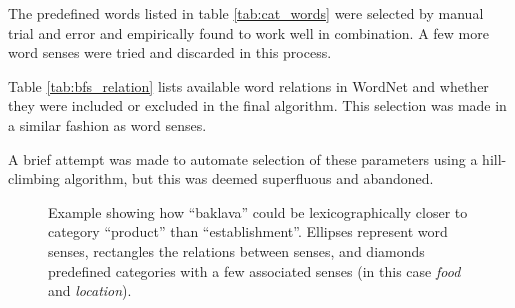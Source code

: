 \documentclass[a4paper,11pt]{kth-mag}
\begin{document}
The predefined words listed in table \ref{tab:cat_words} were selected by manual trial and error and empirically found to work well in combination. A few more word senses were tried and discarded in this process.

Table \ref{tab:bfs_relation} lists available word relations in WordNet and whether they were included or excluded in the final algorithm. This selection was made in a similar fashion as word senses.

A brief attempt was made to automate selection of these parameters using a hill-climbing algorithm, but this was deemed superfluous and abandoned.

\begin{figure}[t]
  \centering
  \caption{Example showing how ``baklava'' could be lexicographically closer to category ``product'' than ``establishment''. Ellipses represent word senses, rectangles the relations between senses, and diamonds predefined categories with a few associated senses (in this case \emph{food} and \emph{location}).}
  \label{fig:baklava_lex}
\end{figure}
\end{document}
